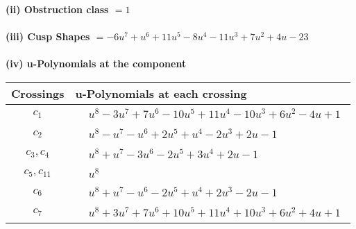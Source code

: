 \documentclass[1p]{elsarticle_modified}
\theoremstyle{definition}
\begin{document}
\flushleft \textbf{(ii) Obstruction class $= 1$}\\~\\
\flushleft \textbf{(iii) Cusp Shapes $= -6 u^7+u^6+11 u^5-8 u^4-11 u^3+7 u^2+4 u-23$}\\~\\
\newpage\renewcommand{\arraystretch}{1}
\flushleft \textbf{(iv) u-Polynomials at the component}\newline \\
\begin{tabular}{m{50pt}|m{274pt}}
Crossings & \hspace{64pt}u-Polynomials at each crossing \\
\hline $$\begin{aligned}c_{1}\end{aligned}$$&$\begin{aligned}
&u^8-3 u^7+7 u^6-10 u^5+11 u^4-10 u^3+6 u^2-4 u+1
\end{aligned}$\\
\hline $$\begin{aligned}c_{2}\end{aligned}$$&$\begin{aligned}
&u^8- u^7- u^6+2 u^5+u^4-2 u^3+2 u-1
\end{aligned}$\\
\hline $$\begin{aligned}c_{3},c_{4}\end{aligned}$$&$\begin{aligned}
&u^8+u^7-3 u^6-2 u^5+3 u^4+2 u-1
\end{aligned}$\\
\hline $$\begin{aligned}c_{5},c_{11}\end{aligned}$$&$\begin{aligned}
&u^8
\end{aligned}$\\
\hline $$\begin{aligned}c_{6}\end{aligned}$$&$\begin{aligned}
&u^8+u^7- u^6-2 u^5+u^4+2 u^3-2 u-1
\end{aligned}$\\
\hline $$\begin{aligned}c_{7}\end{aligned}$$&$\begin{aligned}
&u^8+3 u^7+7 u^6+10 u^5+11 u^4+10 u^3+6 u^2+4 u+1
\end{aligned}$\\

\end{tabular}
\end{document}
